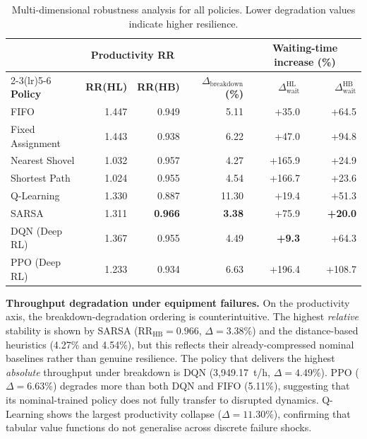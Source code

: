 \documentclass[11pt,a4paper]{article}
\begin{document}
\begin{table}[H]
\centering
\caption{Multi-dimensional robustness analysis for all policies. Lower degradation values indicate higher resilience.}
\label{tab:robustness}
\small
\setlength{\tabcolsep}{4.5pt}
\begin{tabular}{l r r r r r}
\toprule
 & \multicolumn{2}{c}{\textbf{Productivity RR}} & \textbf{} & \multicolumn{2}{c}{\textbf{Waiting-time increase (\%)}} \\
\cmidrule(lr){2-3}\cmidrule(lr){5-6}
\textbf{Policy} & \textbf{RR(HL)} & \textbf{RR(HB)} & \textbf{$\Delta_{\mathrm{breakdown}}$ (\%)} & \textbf{$\Delta_{\mathrm{wait}}^{\mathrm{HL}}$} & \textbf{$\Delta_{\mathrm{wait}}^{\mathrm{HB}}$} \\
\midrule
FIFO               & 1.447 & 0.949 &  5.11  & +35.0  & +64.5  \\
Fixed Assignment   & 1.443 & 0.938 &  6.22  & +47.0  & +94.8  \\
Nearest Shovel     & 1.032 & 0.957 &  4.27  & +165.9 & +24.9  \\
Shortest Path      & 1.024 & 0.955 &  4.54  & +166.7 & +23.6  \\
Q-Learning         & 1.330 & 0.887 & 11.30  & +19.4  & +51.3  \\
SARSA              & 1.311 & \textbf{0.966} & \textbf{3.38} & +75.9 & \textbf{+20.0} \\
DQN (Deep RL)      & 1.367 & 0.955 &  4.49  & \textbf{+9.3}  & +64.3  \\
PPO (Deep RL)      & 1.233 & 0.934 &  6.63  & +196.4 & +108.7 \\
\bottomrule
\end{tabular}
\end{table}

\noindent\textbf{Throughput degradation under equipment failures.} On the productivity axis, the breakdown-degradation ordering is counterintuitive. The highest \emph{relative} stability is shown by SARSA ($\mathrm{RR}_{\mathrm{HB}}=0.966$, $\Delta=3.38\%$) and the distance-based heuristics (4.27\% and 4.54\%), but this reflects their already-compressed nominal baselines rather than genuine resilience. The policy that delivers the highest \emph{absolute} throughput under breakdown is DQN (3,949.17~t/h, $\Delta=4.49\%$). PPO ($\Delta=6.63\%$) degrades more than both DQN and FIFO (5.11\%), suggesting that its nominal-trained policy does not fully transfer to disrupted dynamics. Q-Learning shows the largest productivity collapse ($\Delta=11.30\%$), confirming that tabular value functions do not generalise across discrete failure shocks.
\end{document}

